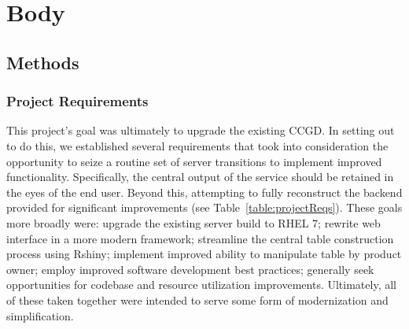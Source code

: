 \documentclass[10pt]{report}
\begin{document}
\chapter{Body}

\section{Methods}

\subsection{Project Requirements}
This project's goal was ultimately to upgrade the existing CCGD\@. In setting out to do this, we established several requirements that took into consideration the opportunity to seize a routine set of server transitions to implement improved functionality. Specifically, the central output of the service should be retained in the eyes of the end user. Beyond this, attempting to fully reconstruct the backend provided for significant improvements (see Table~\ref{table:projectReqs}). These goals more broadly were: upgrade the existing server build to RHEL 7; rewrite web interface in a more modern framework; streamline the central table construction process using Rshiny; implement improved ability to manipulate table by product owner; employ improved software development best practices; generally seek opportunities for codebase and resource utilization improvements. Ultimately, all of these taken together were intended to serve some form of modernization and simplification.
\end{document}
